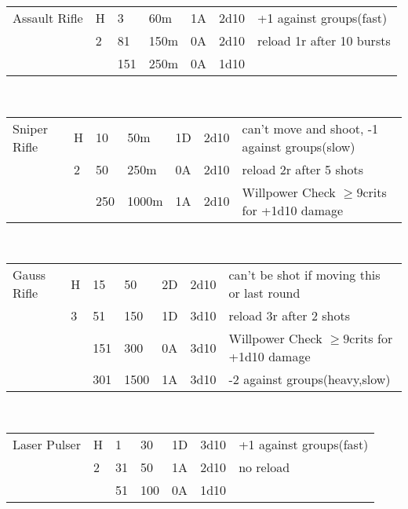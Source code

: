 \documentclass{article}
\begin{document}
 \begin{tabularx}{\textwidth}{p{2cm}p{0.4cm}p{0.5cm}@{ - }p{0.6cm}p{0.6cm}p{0.9cm}p{8cm}}\\\hline
Assault Rifle&H &  3 &  60m         & 1A   & 2d10 & +1 against groups(fast)\\
        &   2    & 81 & 150m        & 0A   & 2d10 & reload 1r after 10 bursts\\
        &       & 151 & 250m        & 0A   & 1d10\\            \end{tabularx}\\ 
 \begin{tabularx}{\textwidth}{p{2cm}p{0.4cm}p{0.5cm}@{ - }p{0.6cm}p{0.6cm}p{0.9cm}p{8cm}}\\\hline
Sniper Rifle&H  & 10 &  50m         & 1D   & 2d10 & can't move and shoot, -1 against groups(slow)\\
        &   2    & 50 & 250m        & 0A   & 2d10 & reload 2r after 5 shots\\
        &       & 250 & 1000m       & 1A   & 2d10 & Willpower Check \(\geq9\)crits for +1d10 damage\\            \end{tabularx}\\ 
 \begin{tabularx}{\textwidth}{p{2cm}p{0.4cm}p{0.5cm}@{ - }p{0.6cm}p{0.6cm}p{0.9cm}p{8cm}}\\\hline
Gauss Rifle&H   & 15  & 50          & 2D   & 2d10 & can't be shot if moving this or last round\\
        &   3    & 51  & 150        & 1D   & 3d10 & reload 3r after 2 shots\\
        &       & 151 & 300         & 0A   & 3d10 & Willpower Check \(\geq9\)crits for +1d10 damage\\
        &       & 301 & 1500        & 1A   & 3d10 & -2 against groups(heavy,slow)\\            \end{tabularx}\\ 
 \begin{tabularx}{\textwidth}{p{2cm}p{0.4cm}p{0.5cm}@{ - }p{0.6cm}p{0.6cm}p{0.9cm}p{8cm}}\\\hline
Laser Pulser&H   & 1  & 30          & 1D   & 3d10 & +1 against groups(fast) \\
        &   2   & 31  & 50         & 1A   & 2d10 & no reload\\
        &       & 51 & 100          & 0A   & 1d10\\            \end{tabularx}\\ 
\end{document}

